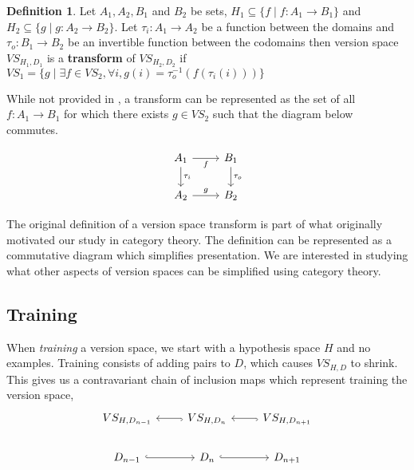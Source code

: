 \documentclass{article}
\theoremstyle{definition}
\newtheorem{definition}{Definition}[section]
\begin{document}
\begin{definition}
Let $A_1, A_2, B_1 $ and $B_2$ be sets, $H_1 \subseteq \{f \mid f: A_1 \rightarrow B_1\}$ and $H_2 \subseteq \{g \mid g: A_2 \rightarrow B_2\}$. Let $\tau_i: A_1 \rightarrow A_2$ be a function between the domains and $\tau_o:B_1 \rightarrow B_2$ be an invertible function between the codomains then version space $VS_{H_1, D_1}$ is a \textbf{transform} of $VS_{H_2, D_2}$ if $VS_1 = \{g \mid \exists f \in VS_2, \forall i,  g(i) = \tau_o^{-1}(f(\tau_i(i)))\}$

While not provided in \cite{short}, a transform can be represented as the set of all $f:A_1 \rightarrow B_1$ for which there exists $g \in VS_2$ such that the diagram below commutes.

\[\begin{tikzcd}
	{A_1} & {B_1} \\
	{A_2} & {B_2}
	\arrow["{\tau_i}", from=1-1, to=2-1]
	\arrow["f"', from=1-1, to=1-2]
	\arrow["{\tau_o}", to=2-2, from=1-2]
	\arrow["g", from=2-1, to=2-2]
\end{tikzcd}\]

The original definition of a version space transform is part of what originally motivated our study in category theory. The definition can be represented as a commutative diagram which simplifies presentation. We are interested in studying what other aspects of version spaces can be simplified using category theory.

\subsection{Training}
When \textit{training} a version space, we start with a hypothesis space $H$ and no examples. Training consists of adding pairs to $D$, which causes $VS_{H,D}$ to shrink. This gives us a contravariant chain of inclusion maps which represent training the version space,
\[\begin{tikzcd}
	{VS_{H,D_{n-1}}} & {VS_{H,D_n}} & {VS_{H,D_{n+1}}} \\
	{D_{n-1}} & {D_n} & {D_{n+1}}
	\arrow[hook, from=1-3, to=1-2]
	\arrow[hook, from=2-2, to=2-3]
	\arrow[hook, from=1-2, to=1-1]
	\arrow[hook, from=2-1, to=2-2]
\end{tikzcd}\]

\end{definition}
\end{document}
